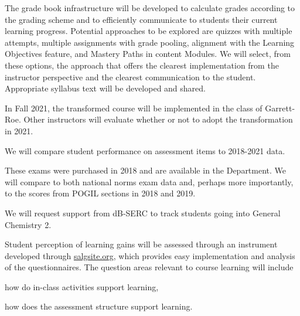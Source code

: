 \documentclass[10pt,letterpaper]{article}
\begin{document}
The grade book infrastructure will be developed to calculate grades according to the grading scheme and to efficiently communicate to students their current learning progress. Potential approaches to be explored are quizzes with multiple attempts, multiple assignments with grade pooling, alignment with the Learning Objectives feature, and Mastery Paths in content Modules. We will select, from these options, the approach that offers the clearest implementation from the instructor perspective and the clearest communication to the student. Appropriate syllabus text will be developed and shared.
 

In Fall 2021, the transformed course will be implemented in the class of Garrett-Roe. Other \pogil instructors will evaluate whether or not to adopt the transformation in 2021. 

%
%


 We will compare student performance on assessment items to 2018-2021 data.

 These exams were purchased in 2018 and are available in the Department. We will compare to both national norms exam data and, perhaps more importantly, to the scores from POGIL sections in 2018 and 2019.

 We will request support from dB-SERC to track students going into General Chemistry 2. 

Student perception of learning gains will be assessed through an instrument developed through \url{salgsite.org}, which provides easy implementation and analysis of the questionnaires. The question areas relevant to course learning will include
\begin{enumerate*}[label=\textbf{\arabic*.)}]
  \item how do in-class activities support learning,
\item how does the assessment structure support learning.
\end{enumerate*}
\end{document}
